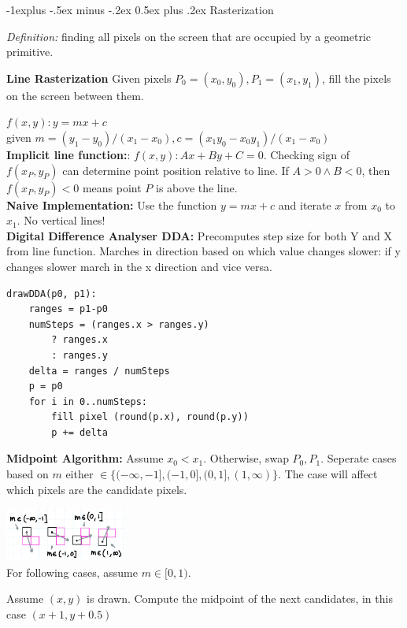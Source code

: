 \documentclass[letterpaper, 8pt]{extarticle}
\makeatletter
\renewcommand{\section}{\@startsection{section}{1}{0mm}%
                                {-1explus -.5ex minus -.2ex}%
                                {0.5ex plus .2ex}%
                                {\normalfont\normalsize\bfseries}}
\makeatother
\begin{document}
\begin{multicols*}{4}
\section{Rasterization}

\textit{Definition:} finding all pixels on the screen that are occupied by a geometric primitive.

\textbf{Line Rasterization}
Given pixels $P_0 = (x_0, y_0), P_1 = (x_1, y_1)$, fill the pixels on the screen between them.

$f(x, y): y = mx + c$\\given $m=(y_1 - y_0)/(x_1 - x_0), c=(x_1y_0 - x_0y_1)/(x_1 - x_0)$\\
\textbf{Implicit line function:}: $f(x,y): Ax + By + C = 0$. Checking sign of $f(x_P, y_P)$ can determine point position relative to line. If $A>0 \land B<0$, then $f(x_P, y_P) < 0$ means point $P$ is above the line.\\

\textbf{Naive Implementation:} Use the function $y=mx+c$ and iterate $x$ from $x_0$ to $x_1$. No vertical lines!\\
\textbf{Digital Difference Analyser DDA:}
Precomputes step size for both Y and X from line function.
Marches in direction based on which value changes slower:
if y changes slower march in the x direction and vice versa.

\begin{lstlisting}
drawDDA(p0, p1):
    ranges = p1-p0
    numSteps = (ranges.x > ranges.y) 
        ? ranges.x
        : ranges.y
    delta = ranges / numSteps
    p = p0
    for i in 0..numSteps:
        fill pixel (round(p.x), round(p.y))
        p += delta
\end{lstlisting}

\textbf{Midpoint Algorithm:} Assume $x_0 < x_1$. Otherwise, swap $P_0, P_1$.
Seperate cases based on $m$ either $\in \{(-\infty, -1], (-1, 0],(0, 1], (1, \infty)\}$.
The case will affect which pixels are the candidate pixels.

\includegraphics[width=4cm]{rasterize-candidates.png}\\
For following cases, assume $m \in [0, 1)$.

Assume $(x, y)$ is drawn. Compute the midpoint of the next candidates, in this case $(x+1, y+0.5)$


\end{multicols*}
\end{document}
